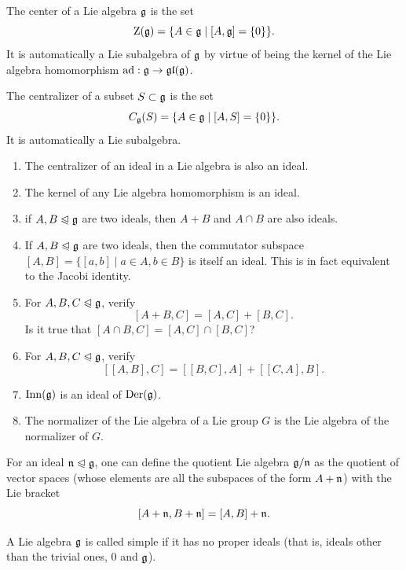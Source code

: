 \begin{defn}
    The center of a Lie algebra $\mathfrak{g}$ is the set
    \[\mathrm{Z}(\mathfrak{g})=\{A\in\mathfrak{g}\mid [A,\mathfrak{g}]=\{0\}\}.\]
    It is automatically a Lie subalgebra of $\mathfrak{g}$ by virtue of being the kernel of the Lie algebra homomorphism $\mathrm{ad}:\mathfrak{g}\to \mathfrak{gl}(\mathfrak{g})$.
\end{defn}

\begin{defn}[Centralizer]
    The centralizer of a subset $S\subset\mathfrak{g}$ is the set
    \[C_{\mathfrak{g}}(S)=\{A\in\mathfrak{g}\mid [A,S]=\{0\}\}.\]
    It is automatically a Lie subalgebra.
\end{defn}

\begin{xca}
\begin{enumerate}
    \item The centralizer of an ideal in a Lie algebra is also an ideal.
    \item The kernel of any Lie algebra homomorphism is an ideal.
    \item if $A,B\trianglelefteqslant\mathfrak{g}$ are two ideals, then $A+B$ and $A\cap B$ are also ideals.
    \item If $A,B\trianglelefteqslant \mathfrak{g}$ are two ideals, then the commutator subspace $[A,B]=\{[a,b]\mid a\in A,b\in B\}$ is itself an ideal. This is in fact equivalent to the Jacobi identity.
    \item For $A,B,C\trianglelefteqslant \mathfrak{g}$, verify
    \[[A+B,C]=[A,C]+[B,C].\]
    Is it true that $[A\cap B,C]=[A,C]\cap [B,C]$?
    \item For $A,B,C\trianglelefteqslant \mathfrak{g}$, verify
    \[[[A,B],C]=[[B,C],A]+[[C,A],B].\]
    \item $\operatorname{Inn}(\mathfrak{g})$ is an ideal of $\operatorname{Der}(\mathfrak{g})$.
    \item The normalizer of the Lie algebra of a Lie group $G$ is the Lie algebra of the normalizer of $G$.
\end{enumerate}
\end{xca}

\begin{defn}
    For an ideal $\mathfrak{n}\trianglelefteqslant\mathfrak{g}$, one can define the quotient Lie algebra $\mathfrak{g}\slash \mathfrak{n}$ as the quotient of vector spaces (whose elements are all the subspaces of the form $A+\mathfrak{n}$) with the Lie bracket
    \[[A+\mathfrak{n},B+\mathfrak{n}]=[A,B]+\mathfrak{n}.\]
\end{defn}

\begin{defn}
    A Lie algebra $\mathfrak{g}$ is called simple if it has no proper ideals (that is, ideals other than the trivial ones, $0$ and $\mathfrak{g}$).
\end{defn}



